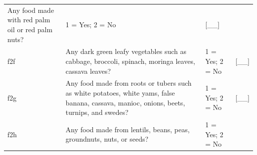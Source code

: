 \documentclass[12pt,a4paper]{book}
\theoremstyle{definition}
\theoremstyle{definition}
\theoremstyle{definition}
\theoremstyle{remark}
\begin{document}
\begin{longtable}[]{@{}llll@{}}
\begin{minipage}[t]{0.41\columnwidth}
Any food made with red palm oil or red palm nuts?\strut
\end{minipage} & \begin{minipage}[t]{0.25\columnwidth}\raggedright
1 = Yes; 2 = No\strut
\end{minipage} & \begin{minipage}[t]{0.13\columnwidth}\raggedright
{[}\_\_{]}\strut
\end{minipage}\tabularnewline
\begin{minipage}[t]{0.09\columnwidth}\raggedright
f2f\strut
\end{minipage} & \begin{minipage}[t]{0.41\columnwidth}\raggedright
Any dark green leafy vegetables such as cabbage, broccoli, spinach,
moringa leaves, cassava leaves?\strut
\end{minipage} & \begin{minipage}[t]{0.25\columnwidth}\raggedright
1 = Yes; 2 = No\strut
\end{minipage} & \begin{minipage}[t]{0.13\columnwidth}\raggedright
{[}\_\_{]}\strut
\end{minipage}\tabularnewline
\begin{minipage}[t]{0.09\columnwidth}\raggedright
f2g\strut
\end{minipage} & \begin{minipage}[t]{0.41\columnwidth}\raggedright
Any food made from roots or tubers such as white potatoes, white yams,
false banana, cassava, manioc, onions, beets, turnips, and swedes?\strut
\end{minipage} & \begin{minipage}[t]{0.25\columnwidth}\raggedright
1 = Yes; 2 = No\strut
\end{minipage} & \begin{minipage}[t]{0.13\columnwidth}\raggedright
{[}\_\_{]}\strut
\end{minipage}\tabularnewline
\begin{minipage}[t]{0.09\columnwidth}\raggedright
f2h\strut
\end{minipage} & \begin{minipage}[t]{0.41\columnwidth}\raggedright
Any food made from lentils, beans, peas, groundnuts, nuts, or
seeds?\strut
\end{minipage} & \begin{minipage}[t]{0.25\columnwidth}\raggedright
1 = Yes; 2 = No\strut
\end{minipage} & \begin{minipage}[t]{0.13\columnwidth}\raggedright

\end{minipage}
\end{longtable}
\end{document}
